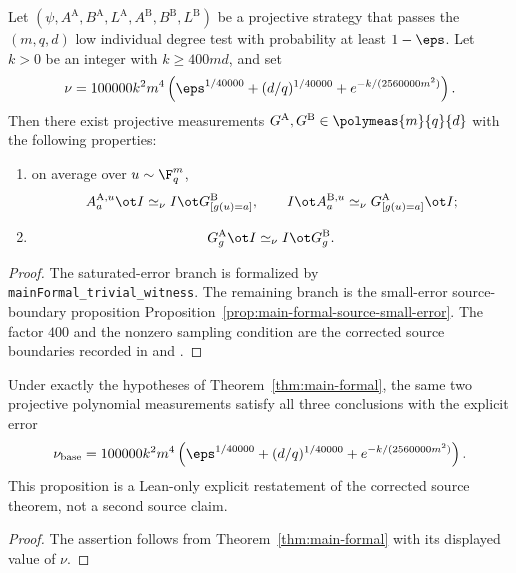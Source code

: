 \begin{theorem}\label{thm:main-formal}
	\leanok
	Let $(\psi, A^{\mathrm A}, B^{\mathrm A}, L^{\mathrm A},
	A^{\mathrm B}, B^{\mathrm B}, L^{\mathrm B})$ be a projective strategy that
	passes the $(m,q,d)$ low individual degree test with probability at least
	$1-\eps$. Let \(k>0\) be an integer with \(k \ge 400md\), and set
	\[
		\nu = 100000 k^2 m^4\left(\eps^{1/40000} + (d/q)^{1/40000} + e^{-k/(2560000m^2)}\right).
	\]
	Then there exist projective measurements
	$G^{\mathrm A}, G^{\mathrm B} \in \polymeas{m}{q}{d}$ with the following
	properties:
	\begin{enumerate}
		\item on average over $u \sim \F_q^m$,
		      \[
			      A_a^{\mathrm A,u} \ot I \simeq_\nu I \ot G^{\mathrm B}_{[g(u)=a]},
			      \qquad
			      I \ot A_a^{\mathrm B,u} \simeq_\nu G^{\mathrm A}_{[g(u)=a]} \ot I;
		      \]
		\item
		      \[
			      G_g^{\mathrm A} \ot I \simeq_\nu I \ot G_g^{\mathrm B}.
		      \]
	\end{enumerate}
\end{theorem}
\begin{proof}
	\leanok
	The saturated-error branch is formalized by
	\texttt{mainFormal\_trivial\_witness}.  The remaining branch is the
	small-error source-boundary proposition
	Proposition~\ref{prop:main-formal-source-small-error}.  The
	factor \(400\) and the nonzero sampling condition are the corrected source
	boundaries recorded in \cite{gap:issue-906-main-formal-k-bound} and
	\cite{gap:issue-422-main-formal-zero-k-boundary}.
\end{proof}

\begin{proposition}
\label{prop:main-formal-explicit-baseline}
	\leanok
	Under exactly the hypotheses of Theorem~\ref{thm:main-formal}, the same two
	projective polynomial measurements satisfy all three conclusions with the
	explicit error
	\[
		\nu_{\mathrm{base}}=
		100000 k^2m^4\left(
			\eps^{1/40000}+(d/q)^{1/40000}
			+e^{-k/(2560000m^2)}\right).
	\]
	This proposition is a Lean-only explicit restatement of the corrected
	source theorem, not a second source claim.
\end{proposition}
\begin{proof}
	\leanok
	The assertion follows from Theorem~\ref{thm:main-formal} with its displayed
	value of $\nu$.
\end{proof}

